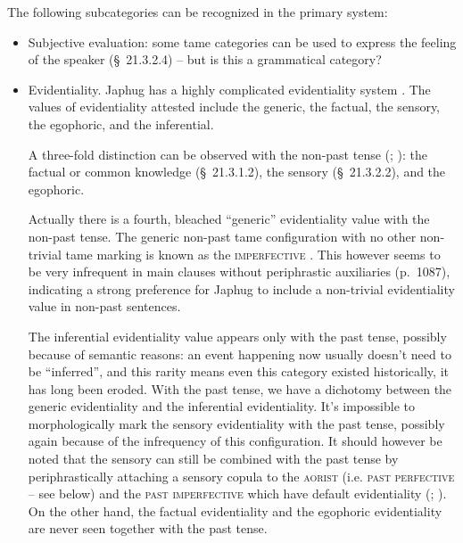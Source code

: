 \documentclass[a4paper, oneside, 12pt]{report}
\newcommand*{\citesec}[1]{\S~{#1}}
\newcommand*{\citetable}[1]{Table~{#1}}
\newcommand*{\citepage}[1]{p.~{#1}}
\newcommand{\category}[1]{\textsc{#1}}
\begin{document}
The following subcategories can be recognized in the primary system:
\begin{itemize}
    \item Subjective evaluation: some \acs{tame} categories can be used to express 
    the feeling of the speaker (\citesec{21.3.2.4}) -- but is this a grammatical category?
    \item Evidentiality.
    Japhug has a highly complicated evidentiality system 
    \citep[\citetable{31.4}]{jacques2015sketch}.
    The values of evidentiality attested include 
    the generic, the factual, the sensory, the egophoric, and the inferential.

    A three-fold distinction can be observed with the non-past tense
    (\citealt[\citesec{21.3.4}]{jacques2021grammar}; 
    \citealt[\citepage{517}]{jacques2019egophoric}): 
    the factual or common knowledge (\citesec{21.3.1.2}), 
    the sensory (\citesec{21.3.2.2}),
    and the egophoric.

    Actually there is a fourth, bleached ``generic'' evidentiality value 
    with the non-past tense.
    The generic non-past \acs{tame} configuration 
    with no other non-trivial \acs{tame} marking 
    is known as the \category{imperfective} \citep[\citesec{21.2}]{jacques2021grammar}.
    This however seems to be very infrequent in main clauses
    without periphrastic auxiliaries (\citepage{1087}),
    indicating a strong preference for Japhug 
    to include a non-trivial evidentiality value in non-past sentences.
    
    The inferential evidentiality value appears only with the past tense,
    possibly because of semantic reasons: 
    an event happening now usually doesn't need to be ``inferred'',
    and this rarity means even this category existed historically,
    it has long been eroded.
    With the past tense, 
    we have a dichotomy between the generic evidentiality and the inferential evidentiality.
    It's impossible to morphologically mark the sensory evidentiality
    with the past tense, 
    possibly again because of the infrequency of this configuration.  
    It should however be noted that 
    the sensory can still be combined with the past tense 
    by periphrastically attaching a sensory copula 
    to the \category{aorist} (i.e. \category{past perfective} -- see below) 
    and the \category{past imperfective}
    which have default evidentiality
    (\citealt[\citesec{21.5.1.8}, \citesec{21.5.3.5}]{jacques2021grammar}; 
    \citealt[\citepage{518}]{jacques2019egophoric}). 
    On the other hand, the factual evidentiality and the egophoric evidentiality
    are never seen together with the past tense.


\end{itemize}
\end{document}
